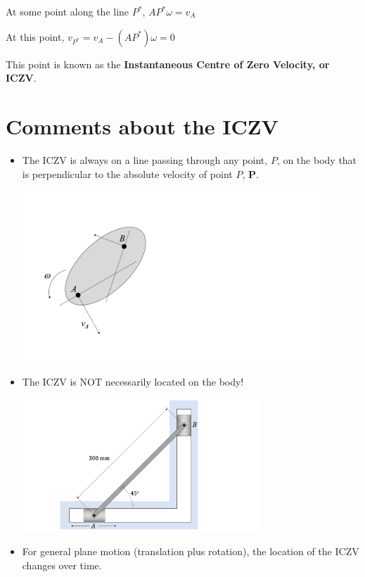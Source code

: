 \documentclass[12pt,letterpaper,twoside]{report}
\begin{document}
At some point along the line $P^{*}$, ${AP^{*}} \omega = v_A$

At this point, $v_{P^{*}}= v_A - (AP^{*}) \omega=0$

This point is known as the \textbf{Instantaneous Centre of Zero Velocity, or ICZV}. 

\newpage
\section{Comments about the ICZV}
\begin{itemize}
\item The ICZV is always on a line passing through any point, $P$, on the body that is perpendicular to the absolute velocity of point $P$, $\bm{P}$. 

\vspace*{2\baselineskip}

\includegraphics[trim={0cm 2cm 0cm 4cm},clip,width=0.9\textwidth, center]{Slide19}

\item The ICZV is NOT necessarily located on the body!

\vspace*{2\baselineskip}

\includegraphics[trim={0cm 0cm 0cm 0cm},clip,width=0.7\textwidth, center]{Slide20}

\newpage
\item For general plane motion (translation plus rotation), the location of the ICZV changes over time. 


\end{itemize}
\end{document}
